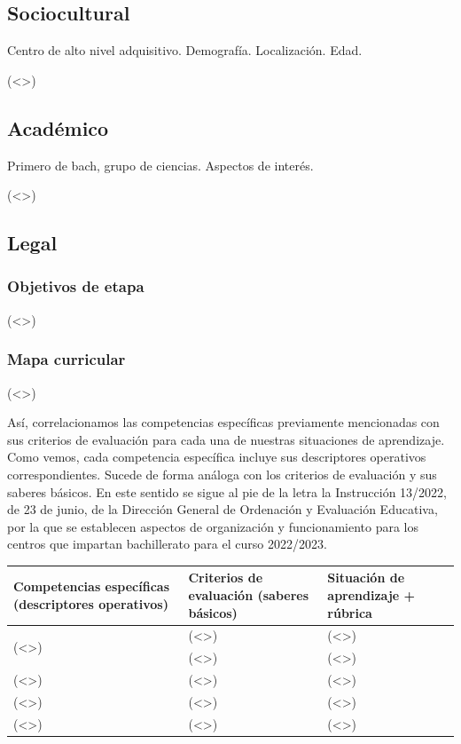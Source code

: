 \documentclass[12pt]{article}
\newcommand{\instr}{Instrucción 13/2022, de 23 de junio, de la Dirección General de Ordenación y Evaluación Educativa, por la que se establecen aspectos de organización y funcionamiento para los centros que impartan bachillerato para el curso 2022/2023}
\begin{document}
\subsection{Sociocultural}

Centro de alto nivel adquisitivo. Demografía. Localización. Edad.

(<>)

\subsection{Académico}

Primero de bach, grupo de ciencias. Aspectos de interés.

(<>)

\subsection{Legal}

\subsubsection{Objetivos de etapa}

(<>)

\subsubsection{Mapa curricular}

(<>)%

Así, correlacionamos las competencias específicas previamente mencionadas con sus criterios de evaluación para cada una de nuestras situaciones de aprendizaje. Como vemos, cada competencia específica incluye sus descriptores operativos correspondientes. Sucede de forma análoga con los criterios de evaluación y sus saberes básicos. En este sentido se sigue al pie de la letra la \instr.

\begin{center}
\begin{tabular}{ |m{5cm}|m{5cm}|m{2cm}| }
 \hline
	Competencias específicas (descriptores operativos) & Criterios de evaluación (saberes básicos) & Situación de aprendizaje + rúbrica\\
 \hline
\multirow{2}{4em}{(<>)}	& (<>)			& (<>) \\
			& (<>)			& (<>) \\
(<>)			& (<>)			& (<>) \\
(<>)			& (<>)			& (<>) \\
(<>)			& (<>)			& (<>) \\
 \hline
\end{tabular}
\end{center}
\end{document}
